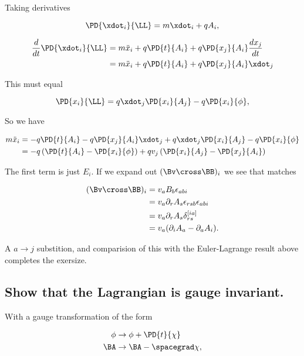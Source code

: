 Taking derivatives

\begin{equation}\label{eqn:classicalMechanicsPs1:80}
\PD{\xdot_i}{\LL} = m \xdot_i + q A_i,
\end{equation}

\begin{align*}
\frac{d}{dt} \PD{\xdot_i}{\LL} 
&= 
m \ddot{x}_i 
+ q \PD{t}{A_i}
+ q \PD{x_j}{A_i} \frac{dx_j}{dt} \\
&=
m \ddot{x}_i 
+ q \PD{t}{A_i}
+ q \PD{x_j}{A_i} \xdot_j
\end{align*}

This must equal

\begin{equation}\label{eqn:classicalMechanicsPs1:100}
\PD{x_i}{\LL} = q \xdot_j \PD{x_i}{A_j} - q \PD{x_i}{\phi},
\end{equation}

So we have

\begin{align*}
m \ddot{x}_i 
&= 
-q \PD{t}{A_i}
- q \PD{x_j}{A_i} \xdot_j
+q \xdot_j \PD{x_i}{A_j} - q \PD{x_i}{\phi} \\
&=
-q \left( \PD{t}{A_i} - \PD{x_i}{\phi} \right)
+q v_j \left( \PD{x_i}{A_j} - \PD{x_j}{A_i} \right)
\end{align*}

The first term is just $E_i$.  If we expand out $(\Bv \cross \BB)_i$ we see that matches

\begin{align*}
(\Bv \cross \BB)_i
&=
v_a B_b \epsilon_{abi} \\
&=
v_a \partial_r A_s \epsilon_{rsb} \epsilon_{abi} \\
&=
v_a \partial_r A_s \delta_{rs}^{[ia]} \\
&=
v_a (\partial_i A_a - \partial_a A_i).
\end{align*}

A $a \rightarrow j$ substition, and comparision of this with the Euler-Lagrange result above completes the exersize.

\subsection{Show that the Lagrangian is gauge invariant.}

With a gauge transformation of the form

\begin{align}\label{eqn:classicalMechanicsPs1:120}
\phi &\rightarrow \phi + \PD{t}{\chi} \\
\BA &\rightarrow \BA - \spacegrad \chi,
\end{align}

